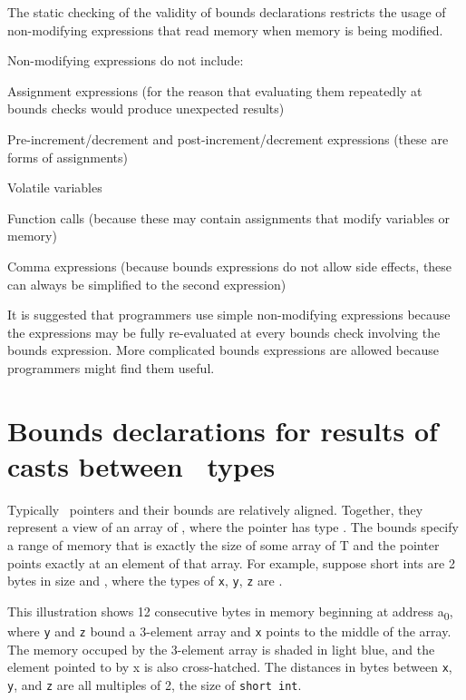 The static checking of the validity of bounds declarations restricts the
usage of non-modifying expressions that read memory when memory is being
modified.

Non-modifying expressions do not include:

\begin{compactitem}
\item
  Assignment expressions (for the reason that evaluating them repeatedly
  at bounds checks would produce unexpected results)
\item
  Pre-increment/decrement and post-increment/decrement expressions
  (these are forms of assignments)
\item
  Volatile variables
\item
  Function calls (because these may contain assignments that modify
  variables or memory)
\item
  Comma expressions (because bounds expressions do not allow side
  effects, these can always be simplified to the second expression)
\end{compactitem}

It is suggested that programmers use simple non-modifying expressions because
the expressions may be fully re-evaluated at every bounds check involving the
bounds expression. More complicated bounds expressions are allowed
because programmers might find them useful.

\section{Bounds declarations for results of casts between \arrayptr\ types}
\label{section:pointer-cast-results}

Typically \arrayptr\ pointers and their bounds are relatively
aligned. Together, they represent a view of an array of , where
the pointer has type
\arrayptrT. The
bounds specify a range of memory that is exactly the size of some array
of T and the pointer points exactly at an element of that array. For
example, suppose short ints are 2 bytes in size and 
{\texttt{}}, where the types of \texttt{x},
\texttt{y}, \texttt{z} are  .

This illustration shows 12 consecutive bytes in memory beginning at
address a\textsubscript{0}, where \texttt{y} and \texttt{z} bound a
3-element array and \texttt{x} points to the middle of the array. The
memory occuped by the 3-element array is shaded in light blue, and the
element pointed to by x is also cross-hatched. The distances in bytes
between \texttt{x}, \texttt{y}, and \texttt{z} are all multiples of 2,
the size of \texttt{short int}.
\begin{center}
\end{center}

